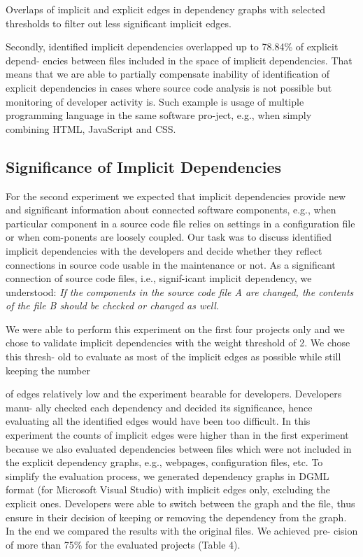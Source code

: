 \documentclass[a4paper]{llncs}
\begin{document}
\begin{table}
\centering
\caption{Overlaps of implicit and explicit edges in dependency graphs with selected thresholds to filter out less significant implicit edges.}

\end{table}


\noindent 
Secondly, identified implicit dependencies overlapped up to 78.84\% of explicit depend- encies between files included in the space of implicit dependencies. That means that we are able to partially compensate inability of identification of explicit dependencies in cases where source code analysis is not possible but monitoring of developer activity is. Such example is usage of multiple programming language in the same software pro-ject, e.g., when simply combining HTML, JavaScript and CSS.
 
 \subsection{Significance of Implicit Dependencies}
 For the second experiment we expected that implicit dependencies provide new and significant information about connected software components, e.g., when particular component in a source code file relies on settings in a configuration file or when com-ponents are loosely coupled. Our task was to discuss identified implicit dependencies with the developers and decide whether they reflect connections in source code usable in the maintenance or not. As a significant connection of source code files, i.e., signif-icant implicit dependency, we understood: \textit{If the components in the source code file A are changed, the contents of the file B should be checked or changed as well}.

We were able to perform this experiment on the first four projects only and we chose to validate implicit dependencies with the weight threshold of 2. We chose this thresh- old to evaluate as most of the implicit edges as possible while still keeping the number
 
 
 \newpage\noindent
 of edges relatively low and the experiment bearable for developers. Developers manu- ally checked each dependency and decided its significance, hence evaluating all the identified edges would have been too difficult. In this experiment the counts of implicit edges were higher than in the first experiment because we also evaluated dependencies between files which were not included in the explicit dependency graphs, e.g., webpages, configuration files, etc. To simplify the evaluation process, we generated dependency graphs in DGML format (for Microsoft Visual Studio) with implicit edges only, excluding the explicit ones. Developers were able to switch between the graph and the file, thus ensure in their decision of keeping or removing the dependency from the graph. In the end we compared the results with the original files. We achieved pre- cision of more than 75\% for the evaluated projects (Table 4).
 
\end{document}

